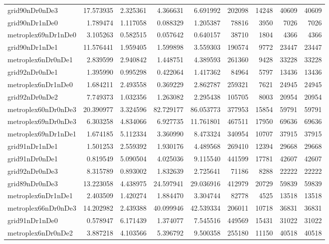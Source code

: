 \begin{longtable}{|l|r|r|r|r|r|r|r|r|}
grid90nDr0nDe3 & 17.573935 & 2.325361 & 4.366631 & 6.691992 & 202098 & 14248 & 40609 & 40609 \\
grid90nDr1nDe0 & 1.789474 & 1.117058 & 0.088329 & 1.205387 & 78816 & 3950 & 7026 & 7026 \\
metroplex69nDr1nDe0 & 3.105263 & 0.582515 & 0.057642 & 0.640157 & 38710 & 1804 & 4366 & 4366 \\
grid90nDr1nDe1 & 11.576441 & 1.959405 & 1.599898 & 3.559303 & 190574 & 9772 & 23447 & 23447 \\
metroplex6nDr0nDe1 & 2.839599 & 2.940842 & 1.448751 & 4.389593 & 261360 & 9428 & 33228 & 33228 \\
grid92nDr0nDe1 & 1.395990 & 0.995298 & 0.422064 & 1.417362 & 84964 & 5797 & 13436 & 13436 \\
metroplex6nDr1nDe0 & 1.684211 & 2.493558 & 0.369229 & 2.862787 & 259321 & 7621 & 24945 & 24945 \\
grid92nDr0nDe2 & 7.749373 & 1.032356 & 1.263082 & 2.295438 & 105705 & 8003 & 20954 & 20954 \\
metroplex60nDr0nDe3 & 20.390977 & 3.324596 & 82.729177 & 86.053773 & 377953 & 15854 & 59791 & 59791 \\
metroplex69nDr0nDe3 & 6.303258 & 4.834066 & 6.927735 & 11.761801 & 467511 & 17950 & 69636 & 69636 \\
metroplex69nDr1nDe1 & 1.674185 & 5.112334 & 3.360990 & 8.473324 & 340954 & 10707 & 37915 & 37915 \\
grid91nDr1nDe1 & 1.501253 & 2.559392 & 1.930176 & 4.489568 & 269410 & 12394 & 29668 & 29668 \\
grid91nDr0nDe1 & 0.819549 & 5.090504 & 4.025036 & 9.115540 & 441599 & 17781 & 42607 & 42607 \\
grid92nDr0nDe3 & 8.315789 & 0.893002 & 1.832639 & 2.725641 & 71186 & 8288 & 22222 & 22222 \\
grid89nDr0nDe3 & 13.223058 & 4.438975 & 24.597941 & 29.036916 & 412979 & 20729 & 59839 & 59839 \\
metroplex6nDr1nDe1 & 2.403509 & 1.420274 & 1.884470 & 3.304744 & 82778 & 4525 & 13518 & 13518 \\
metroplex66nDr0nDe3 & 14.202982 & 2.439388 & 40.099946 & 42.539334 & 206011 & 10718 & 36831 & 36831 \\
grid91nDr1nDe0 & 0.578947 & 6.171439 & 1.374077 & 7.545516 & 449569 & 15431 & 31022 & 31022 \\
metroplex6nDr0nDe2 & 3.887218 & 4.103566 & 5.396792 & 9.500358 & 255180 & 11150 & 40518 & 40518 \\

\end{longtable}
